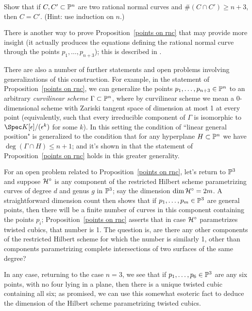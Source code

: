 \begin{exercise}
Show that if $C, C' \subset \PP^n$ are two rational normal curves and $\#(C \cap C') \geq n+3$, then $C = C'$. (Hint: use induction on $n$.)
\end{exercise}

There is another way to prove Proposition~\ref{points on rnc} that may provide more insight (it actually produces the equations defining the rational normal curve through the points $p_1,\dots,p_{n+3}$); this is described in \cite{Montreal}. 

There are also a number of further statements and open problems involving generalizations of this construction. For example, in the statement of Proposition~\ref{points on rnc}, we can generalize the points $p_1,\dots, p_{n+3} \in \PP^n$ to an arbitrary \emph{curvilinear scheme} $\Gamma \subset \PP^n$, where by curvilinear scheme we mean a 0-dimensional scheme with Zariski tangent space of dimension at most 1 at every point (equivalently, such that every irreducible component of $\Gamma$ is isomorphic to $\Spec K[\epsilon]/(\epsilon^k)$ for some $k$). In this setting the condition of ``linear general position" is generalized to the condition that for any hyperplane $H \subset \PP^n$ we have $\deg(\Gamma \cap H) \leq n+1$; and it's shown in \cite{Eisenbud-Harris} that the statement of Proposition~\ref{points on rnc} holds in this greater generality.

For an open problem related to Proposition~\ref{points on rnc}, let's return to $\PP^3$ and suppose $\cH^\circ$ is  any component of the restricted Hilbert scheme parametrizing curves of degree $d$ and genus $g$ in $\PP^3$; say the dimension $\dim \cH^\circ = 2m$. A straightforward dimension count then shows that if $p_1,\dots,p_m \in \PP^3$ are general points, then there will be a finite number of curves in this component containing the points $p_i$; Proposition~\ref{points on rnc} asserts that in case $\cH^\circ$ parametrizes twisted cubics, that number is 1. The question is, are there any other components of the restricted Hilbert scheme for which the number is similarly 1, other than components parametrizing complete intersections of two surfaces of the same degree?

In any case, returning to the case $n=3$, we see that if $p_1,\dots,p_6 \in \PP^3$ are any six points, with no four lying in a plane, then there is a unique twisted cubic containing all six; as promised, we can use this somewhat esoteric fact to deduce the dimension of the Hilbert scheme parametrizing twisted cubics.

